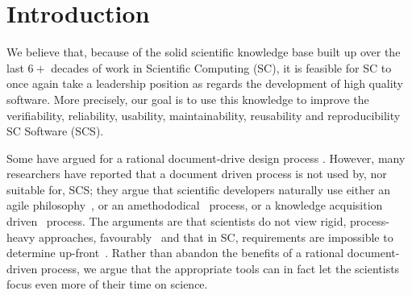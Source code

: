 \documentclass{sig-alternate-05-2015}
\newcommand{\lss}{Drasil}
\begin{document}
\maketitle
\begin{abstract}
As a relatively mature field, scientific computing has the opportunity to
lead other software fields by leveraging its solid, existing knowledge base.  By
following a rational design process, desirable software qualities such as
the qualities of traceability, verifiability, and reproducibility, are 
arguable easier to reach than for other classes of software.

We have begun development of a framework, \lss{}, to put this into practice.
Our aims are to ensure complete traceability, to facilitate agility in the
face of ever changing scientific computing projects, and ensure
that software artifacts can be easily and quickly extracted from \lss{}.

Using an example-based approach to our prototype implementation, we have
already seen many benefits. \lss{}
keeps all software artifacts (requirements, design, code, tests, build
scripts, documentation, etc) synchronized with each other. This allows for
reuse of common concepts across projects, and aids in the verification of
software. It is our hope that \lss{} will lead to the development of higher
quality software at lower cost over the long term.
\end{abstract}


%
%
\printccsdesc


\section{Introduction}

We believe that, because of the solid scientific knowledge base built up
over the last $6+$ decades of work in Scientific Computing (SC), it is feasible
for SC to once again take a leadership position as regards the development
of high quality software.  More precisely, our goal is to use this knowledge
to improve the verifiability, reliability, usability, maintainability,
reusability and reproducibility SC Software (SCS).

Some have argued for a rational document-drive design process 
\cite{SmithAndKoothoor2016}.  However, many researchers have
reported that a document driven process is not used by, nor suitable for, SCS;
they argue that scientific developers naturally use either an agile
philosophy~\cite{CarverEtAl2007, EasterbrookAndJohns2009, Segal2005}, or an
amethododical~\cite{Kelly2013} process, or a knowledge acquisition
driven~\cite{Kelly2015} process.  The arguments are that scientists do not
view rigid, process-heavy approaches, favourably~\cite{CarverEtAl2007} and that
in SC, requirements are impossible to determine up-front~\cite{CarverEtAl2007,
  SegalAndMorris2008}.  Rather than abandon the benefits of a rational
document-driven process, we argue that the appropriate tools can in fact
let the scientists focus even more of their time on science.
\end{document}
